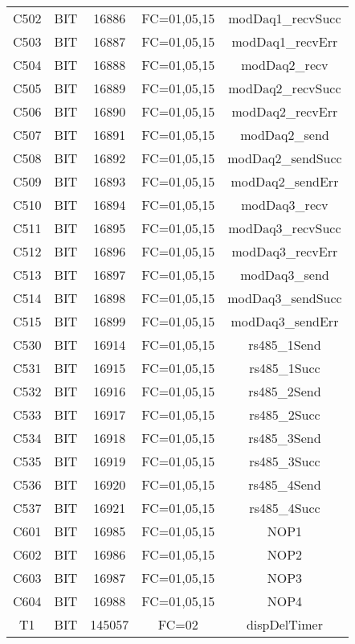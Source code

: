 \begin{center}
\begin{longtable}[c]{ |c|c|c|c|c| }
        C502	&	BIT	&	16886	&	FC=01,05,15	&	modDaq1\_recvSucc\\
        C503	&	BIT	&	16887	&	FC=01,05,15	&	modDaq1\_recvErr\\
        C504	&	BIT	&	16888	&	FC=01,05,15	&	modDaq2\_recv\\
        C505	&	BIT	&	16889	&	FC=01,05,15	&	modDaq2\_recvSucc\\
        C506	&	BIT	&	16890	&	FC=01,05,15	&	modDaq2\_recvErr\\
        C507	&	BIT	&	16891	&	FC=01,05,15	&	modDaq2\_send\\
        C508	&	BIT	&	16892	&	FC=01,05,15	&	modDaq2\_sendSucc\\
        C509	&	BIT	&	16893	&	FC=01,05,15	&	modDaq2\_sendErr\\
        C510	&	BIT	&	16894	&	FC=01,05,15	&	modDaq3\_recv\\
        C511	&	BIT	&	16895	&	FC=01,05,15	&	modDaq3\_recvSucc\\
        C512	&	BIT	&	16896	&	FC=01,05,15	&	modDaq3\_recvErr\\
        C513	&	BIT	&	16897	&	FC=01,05,15	&	modDaq3\_send\\
        C514	&	BIT	&	16898	&	FC=01,05,15	&	modDaq3\_sendSucc\\
        C515	&	BIT	&	16899	&	FC=01,05,15	&	modDaq3\_sendErr\\
        C530	&	BIT	&	16914	&	FC=01,05,15	&	rs485\_1Send\\
        C531	&	BIT	&	16915	&	FC=01,05,15	&	rs485\_1Succ\\
        C532	&	BIT	&	16916	&	FC=01,05,15	&	rs485\_2Send\\
        C533	&	BIT	&	16917	&	FC=01,05,15	&	rs485\_2Succ\\
        C534	&	BIT	&	16918	&	FC=01,05,15	&	rs485\_3Send\\
        C535	&	BIT	&	16919	&	FC=01,05,15	&	rs485\_3Succ\\
        C536	&	BIT	&	16920	&	FC=01,05,15	&	rs485\_4Send\\
        C537	&	BIT	&	16921	&	FC=01,05,15	&	rs485\_4Succ\\
        C601	&	BIT	&	16985	&	FC=01,05,15	&	NOP1\\
        C602	&	BIT	&	16986	&	FC=01,05,15	&	NOP2\\
        C603	&	BIT	&	16987	&	FC=01,05,15	&	NOP3\\
        C604	&	BIT	&	16988	&	FC=01,05,15	&	NOP4\\
        T1	&	BIT	&	145057	&	FC=02	&	dispDelTimer\\

\end{longtable}
\end{center}
